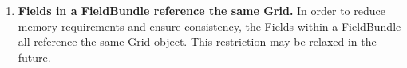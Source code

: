 

\begin{enumerate}

\item{\bf Fields in a FieldBundle reference the same Grid.}
In order to reduce memory requirements and ensure consistency, the 
Fields within a FieldBundle all reference the same Grid object.  This
restriction may be relaxed in the future.

\end{enumerate}



